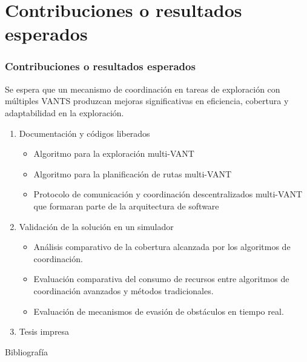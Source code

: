 \documentclass[
  24pt, %
  aspectratio=169, %
]{beamer}
\begin{document}
\section{Contribuciones o resultados esperados}
\begin{frame}
  \frametitle{Contribuciones o resultados esperados}
  Se espera que un mecanismo de coordinación en tareas de exploración con múltiples VANTS produzcan mejoras significativas en eficiencia, cobertura y adaptabilidad en la exploración.
  \begin{enumerate}
  \item<1-> Documentación y códigos liberados
    \begin{itemize}
    \item Algoritmo para la exploración multi-VANT
    \item Algoritmo para la planificación de rutas multi-VANT
    \item Protocolo de comunicación y coordinación descentralizados multi-VANT que formaran parte de la arquitectura de software
    \end{itemize}
  \item<2-> Validación de la solución en un simulador
    \begin{itemize}
    \item Análisis comparativo de la cobertura alcanzada por los algoritmos de coordinación.
    \item Evaluación comparativa del consumo de recursos entre algoritmos de coordinación avanzados y métodos tradicionales.
    \item Evaluación de mecanismos de evasión de obstáculos en tiempo real.
    \end{itemize}
  \item<3-> Tesis impresa
  \end{enumerate}
\end{frame}

\begin{frame}{Bibliografía}
  \tiny
  
  
\end{frame}
\end{document}
